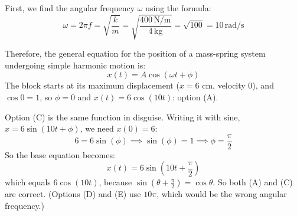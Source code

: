 \begin{Answer}
	[ref={ex:springequation}] First, we find the angular frequency $\omega$ using
	the formula:
	\[
		\omega = 2\pi f = \sqrt{\frac{k}{m}}= \sqrt{\frac{400 \, \text{N/m}}{4 \,
		\text{kg}}}= \sqrt{100}= 10 \, \text{rad/s}
	\]

	Therefore, the general equation for the position of a mass-spring system undergoing
	simple harmonic motion is:
	\[
		x(t) = A \cos(\omega t + \phi)
	\]
	The block starts at its maximum displacement ($x = 6$ cm, velocity 0), and
	$\cos 0 = 1$, so $\phi = 0$ and $x(t) = 6\cos(10t)$: option (A).

	Option (C) is the same function in disguise. Writing it with sine,
	$x = 6\sin(10t + \phi)$, we need $x(0) = 6$:
	\[
		6 = 6 \sin(\phi) \implies \sin(\phi) = 1 \implies \phi = \frac{\pi}{2}
	\]
	So the base equation becomes:
	\[
		x(t) = 6 \sin(10t + \frac{\pi}{2})
	\]
	which equals $6\cos(10t)$, because $\sin(\theta + \frac{\pi}{2}) =
	\cos\theta$. So both (A) and (C) are correct. (Options (D) and (E) use
	$10\pi$, which would be the wrong angular frequency.)
\end{Answer}








